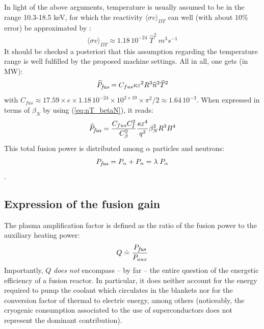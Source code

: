 \documentclass[12pt]{iopart}
\newcommand{\Pfus}{{P_{\textrm{\it\footnotesize fus}}}}
\newcommand{\hatPfus}{{\widehat{P}_{\textrm{\it\footnotesize fus}}}}
\newcommand{\newstuff}[1]{\color{blue}{#1}\color{black}}
\begin{document}
In light of the above arguments, temperature is usually assumed to be in the range 10.3-18.5 keV, for which the reactivity $\langle \sigma v \rangle_{DT}$ can well (with about $10\%$ error) be approximated by \cite{FusionCEA1987}: 
\begin{equation*}
\langle \sigma v \rangle_{DT} \approx 1.18\, 10^{-24}\; \widehat T^2 \;{m^3 s^{-1}}
\end{equation*}
It should be checked a posteriori that this assumption regarding the temperature range is well fulfilled by the proposed machine settings.
All in all, one gets (in MW):
\begin{equation}
\hatPfus = C_{fus} \kappa \varepsilon^2 R^3 \widehat n^2 \widehat T^2  
\label{eq:DT_fusion_power}
\end{equation}
with $C_{fus} \approx 17.59 \times e\times 1.18\, 10^{-24} \times 10^{2\times19}\times \pi^2/2 \approx 1.64\, 10^{-3}$. When expressed in terms of $\beta_N$ by using (\ref{eq:nT_betaN}), it reads:
\begin{equation}
\hatPfus = \frac{C_{fus}C_I^2}{C_\beta^2} \frac{\kappa \varepsilon^4}{q^2} 
\beta_N^2 R^3 B^4 
\label{eq:DT_fusion_power_betaN}
\end{equation}
This total fusion power is distributed among $\alpha$ particles and neutrons: 
\begin{equation*}
\Pfus = P_\alpha + P_n = \lambda \; P_\alpha
\label{eq:P_alpha}
\end{equation*}
\newstuff{where we will retain the value $\lambda = 4.94$ hereafter}. 


\subsection{Expression of the fusion gain} \label{subsec:Q}

The plasma amplification factor is defined as the ratio of the fusion power to the auxiliary heating power:
\begin{equation}
Q \doteq \frac{\Pfus}{P_{aux}}
\label{eq:Q}
\end{equation}
Importantly, $Q$ \emph{does not} encompass -- by far -- the entire question of the energetic efficiency of a fusion reactor. In particular, it does neither account for the energy required to pump the coolant which circulates in the blankets nor for the conversion factor of thermal to electric energy, among others (noticeably, the cryogenic consumption associated to the use of superconductors does not represent the dominant contribution).
\end{document}

